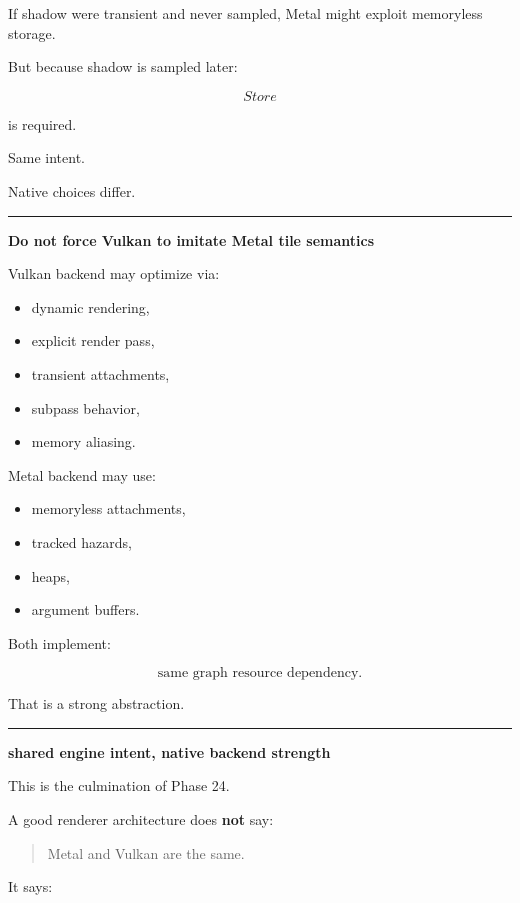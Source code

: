 If shadow were transient and never sampled, Metal might exploit memoryless storage.

But because shadow is sampled later:

\[
Store
\]

is required.

Same intent.

Native choices differ.

\begin{center}\rule{0.5\linewidth}{0.5pt}\end{center}

\textbf{Do not force Vulkan to imitate Metal tile semantics}

Vulkan backend may optimize via:

\begin{itemize}
\tightlist
\item
  dynamic rendering,
\item
  explicit render pass,
\item
  transient attachments,
\item
  subpass behavior,
\item
  memory aliasing.
\end{itemize}

Metal backend may use:

\begin{itemize}
\tightlist
\item
  memoryless attachments,
\item
  tracked hazards,
\item
  heaps,
\item
  argument buffers.
\end{itemize}

Both implement:

\[
\text{same graph resource dependency}.
\]

That is a strong abstraction.

\begin{center}\rule{0.5\linewidth}{0.5pt}\end{center}

\textbf{shared engine intent, native backend strength}

This is the culmination of Phase 24.

A good renderer architecture does \textbf{not} say:

\begin{quote}
Metal and Vulkan are the same.
\end{quote}

It says:

